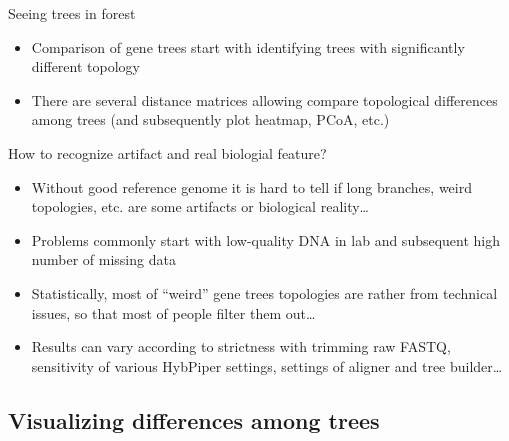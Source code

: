 \documentclass[compress, ucs, xelatex, 11pt, xcolor=x11names, aspectratio=169,
	hyperref={
		bookmarks=true,
		unicode=true,
		colorlinks=true,
		pdftitle={HybSeq course},
		plainpages=false,
		pdfauthor={Vojtech Zeisek},
		pdfsubject={Practical processing of HybSeq target enrichment sequencing data on computing grids like MetaCentrum},
		pdfcreator={XeLaTeX},
		pdfkeywords={BASH, command line, GNU, HybSeq, Linux, MetaCentrum, sequencing shell, target enrichment},
		linkcolor=Turquoise4, %
		anchorcolor=DodgerBlue4, %
		citecolor=DodgerBlue4, %
		filecolor=DodgerBlue4, %
		menucolor=Tan4, %
		urlcolor=DarkOliveGreen4, %
		pdftex},
	url={hyphens, lowtilde} %
	]{beamer}
\begin{document}
\begin{frame}{Seeing trees in forest}
	\begin{itemize}
		\item Comparison of gene trees start with identifying trees with significantly different topology
		\item There are several distance matrices allowing compare topological differences among trees (and subsequently plot heatmap, PCoA, etc.)
	\end{itemize}
	\begin{block}{How to recognize artifact and real biologial feature?}
		\begin{itemize}
			\item Without good reference genome it is hard to tell if long branches, weird topologies, etc. are some artifacts or biological reality\ldots
			\item Problems commonly start with low-quality DNA in lab and subsequent high number of missing data
			\item Statistically, most of \enquote{weird} gene trees topologies are rather from technical issues, so that most of people filter them out\ldots
			\item Results can vary according to strictness with trimming raw FASTQ, sensitivity of various HybPiper settings, settings of aligner and tree builder\ldots
		\end{itemize}
	\end{block}
\end{frame}

\subsection{Visualizing differences among trees}
\end{document}
